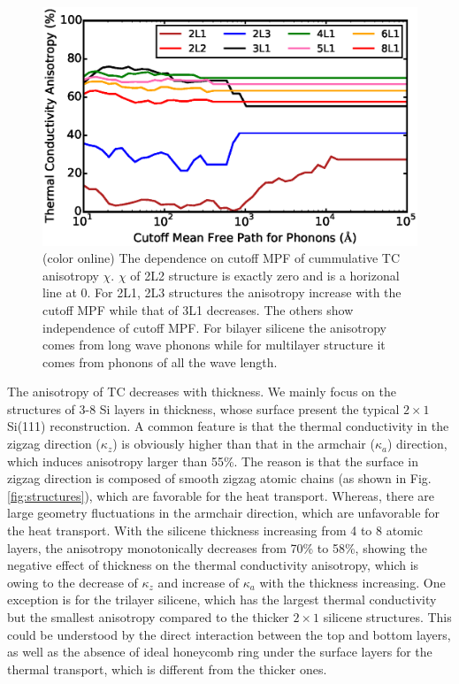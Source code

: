\documentclass[review]{elsarticle}
\begin{document}
\begin{figure}[b]
  \includegraphics[angle= 0, width=0.9\linewidth]{images/chi.eps}{}
  \caption{\label{fig:chi} (color online) The dependence on cutoff MPF of cummulative TC anisotropy $\chi$. $\chi$ of 2L2 structure is exactly zero and is a horizonal line at 0. For 2L1, 2L3  structures the anisotropy increase with the cutoff MPF while that of 3L1 decreases. The others show independence of cutoff MPF. For bilayer silicene the anisotropy comes from long wave phonons while for multilayer structure it comes from phonons of all the wave length. }
\end{figure}

The anisotropy of TC decreases with thickness. We mainly focus on the structures of 3-8 Si layers in thickness, whose surface present the typical $2 \times 1$ Si(111) reconstruction. A common feature is that the thermal conductivity in the zigzag direction ($\kappa_z$) is obviously higher than that  in the armchair ($\kappa_a$) direction, which induces anisotropy larger than 55\%.
The reason is that the surface in zigzag direction is composed of smooth zigzag atomic chains (as shown in Fig.\ref{fig:structures}), which are favorable for the heat transport. Whereas,  there are large geometry fluctuations in the armchair direction, which are unfavorable for the heat transport.
With the silicene thickness increasing from 4 to 8 atomic layers, the anisotropy monotonically decreases from 70\% to 58\%, showing the negative  effect of thickness on the thermal conductivity anisotropy, which  is owing to the decrease of $\kappa_z$ and increase of $\kappa_a$  with the  thickness increasing.
One exception is for the trilayer silicene, which has the largest thermal conductivity but the smallest  anisotropy compared to the thicker  $2\times1$ silicene structures.  This could be understood by the direct interaction between the top and bottom layers, as well as the absence of ideal honeycomb ring under the surface layers  for the thermal transport, which is different from the thicker ones\cite{Guo2015Structural}.
\end{document}

